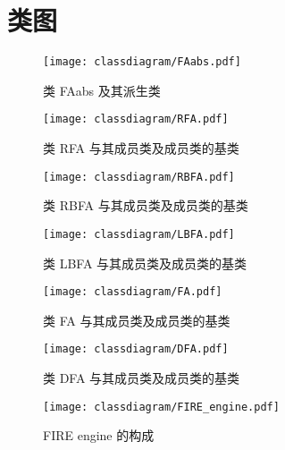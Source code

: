 \chapter{类图}

\begin{figure}[!htbp]
    \centering
        \texttt{[image: classdiagram/FAabs.pdf]}
    \caption{类 FAabs 及其派生类}
    \label{fig:class-faabs}
\end{figure}

\begin{figure}[!htbp]
    \centering
        \texttt{[image: classdiagram/RFA.pdf]}
    \caption{类 RFA 与其成员类及成员类的基类}
    \label{fig:class-rfa}
\end{figure}

\begin{figure}[!htbp]
    \centering
        \texttt{[image: classdiagram/RBFA.pdf]}
    \caption{类 RBFA 与其成员类及成员类的基类}
    \label{fig:class-rbfa}
\end{figure}

\begin{figure}[!htbp]
    \centering
        \texttt{[image: classdiagram/LBFA.pdf]}
    \caption{类 LBFA 与其成员类及成员类的基类}
    \label{fig:class-lbfa}
\end{figure}

\begin{figure}[!htbp]
    \centering
        \texttt{[image: classdiagram/FA.pdf]}
    \caption{类 FA 与其成员类及成员类的基类}
    \label{fig:class-fa}
\end{figure}

\begin{figure}[!htbp]
    \centering
        \texttt{[image: classdiagram/DFA.pdf]}
    \caption{类 DFA 与其成员类及成员类的基类}
    \label{fig:class-dfa}
\end{figure}

\begin{figure}[!htbp]
    \centering
        \texttt{[image: classdiagram/FIRE\_engine.pdf]}
    \caption{FIRE engine 的构成}
    \label{fig:FIRE-engine}
\end{figure}